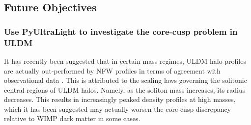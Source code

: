 \subsection{Future Objectives}

\subsubsection{Use PyUltraLight to investigate the core-cusp problem in ULDM}

It has recently been suggested that in certain mass regimes, ULDM halo profiles are actually out-performed by NFW profiles in terms of agreement with observational data \cite{Robles:2018fur}. This is attributed to the scaling laws governing the solitonic central regions of ULDM halos. Namely, as the soliton mass increases, its radius decreases. This results in increasingly peaked density profiles at high masses, which it has been suggested may actually worsen the core-cusp discrepancy relative to WIMP dark matter in some cases. 

